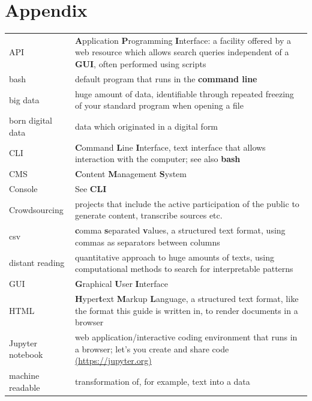\documentclass[
  letterpaper,
]{book}
\begin{document}
\appendix
{}

\hypertarget{appendix}{%
\chapter{Appendix}\label{appendix}}

\begin{longtable}[]{@{}
  >{\raggedright\arraybackslash}p{}
  >{\raggedright\arraybackslash}p{}@{}}
\toprule()
\endhead
API & \textbf{A}pplication \textbf{P}rogramming \textbf{I}nterface: a
facility offered by a web resource which allows search queries
independent of a \textbf{GUI}, often performed using scripts \\
bash & default program that runs in the \textbf{command line} \\
big data & huge amount of data, identifiable through repeated freezing
of your standard program when opening a file \\
born digital data & data which originated in a digital form \\
CLI & \textbf{C}ommand \textbf{L}ine \textbf{I}nterface, text interface
that allows interaction with the computer; see also \textbf{bash} \\
CMS & \textbf{C}ontent \textbf{M}anagement \textbf{S}ystem \\
Console & See \textbf{CLI} \\
Crowdsourcing & projects that include the active participation of the
public to generate content, transcribe sources etc. \\
csv & \textbf{c}omma \textbf{s}eparated \textbf{v}alues, a structured
text format, using commas as separators between columns \\
distant reading & quantitative approach to huge amounts of texts, using
computational methods to search for interpretable patterns \\
GUI & \textbf{G}raphical \textbf{U}ser \textbf{I}nterface \\
HTML & \textbf{H}yper\textbf{t}ext \textbf{M}arkup \textbf{L}anguage, a
structured text format, like the format this guide is written in, to
render documents in a browser \\
Jupyter notebook & web application/interactive coding environment that
runs in a browser; let's you create and share code
\href{https://jupyter.org}{(https://jupyter.org)} \\
machine readable & transformation of, for example, text into a data

\end{longtable}
\end{document}
